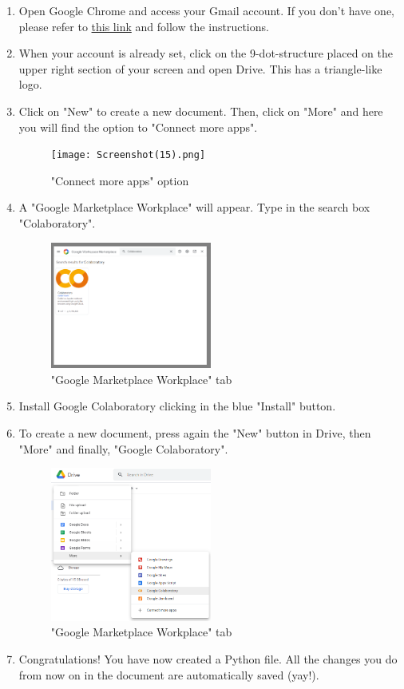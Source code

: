 \begin{enumerate}
    \item Open Google Chrome and access your Gmail account. If you don't have one, please refer to \href{https://support.google.com/mail/answer/56256?hl=en}{this link} and follow the instructions.
    \item When your account is already set, click on the 9-dot-structure placed on the upper right section of your screen and open Drive. This has a triangle-like logo.
    \item Click on "New" to create a new document. Then, click on "More" and here you will find the option to "Connect more apps".
    \begin{figure}[H]
        \centering
        \texttt{[image: Screenshot(15).png]}
        \caption{"Connect more apps" option}
        \label{fig:connect-more-apps}
    \end{figure}
    \item A "Google Marketplace Workplace" will appear. Type in the search box "Colaboratory".
    \begin{figure}
        \centering
        \includegraphics[width=0.5\textwidth]{Figures/Screenshot(18).png}
        \caption{"Google Marketplace Workplace" tab}
        \label{fig:search-colab}
    \end{figure}
    \item Install Google Colaboratory clicking in the blue "Install" button.
    \item To create a new document, press again the "New" button in Drive, then "More" and finally, "Google Colaboratory".
    \begin{figure}[htb]
        \centering
        \includegraphics[width=0.5\textwidth]{Figures/Screenshot(21).png}
        \caption{"Google Marketplace Workplace" tab}
        \label{fig:google-marketplace}
    \end{figure}
    \item Congratulations! You have now created a Python file. All the changes you do from now on in the document are automatically saved (yay!).
\end{enumerate}

